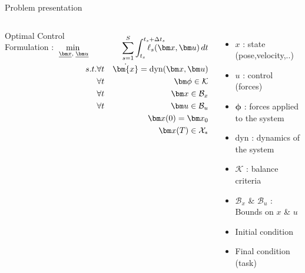 \begin{frame}{Problem presentation}

\begin{columns}


%



Optimal Control Formulation :

\begin{align*}
\hspace{-3em}	\underset{\substack{\hspace{0.2em} \underline{\bm x}, \; \underline{\bm u}} }{\min } \ \ \  
	& & \hspace{-3em} {\sum_{s=1}^S} \int_{t_{s}}^{t_{s}+\Delta t_s\hspace{-4em}} \ell_{s} (\bm x, \bm u) \, dt \\
	s.t. & \forall t & \dot{\bm{x}} = \text{dyn}(\bm x, \bm u) \\
	&  \forall t& \bm\phi \in \mathcal{K} \\
  &  \forall t& {\bm x} \in \mathcal{B}_x \\ 
  &  \forall t& {\bm u} \in \mathcal{B}_u \\ 
	& & \bm x(0) = \bm x_{0} \\
	& & \bm x(T) \in \mathcal{X}_*
\end{align*}


\vspace*{0.7cm}
\begin{itemize}
\item $x$ : state (pose,velocity,..)
\item $u$ : control (forces)
\item $\bm\phi$ : forces applied to the system
\item $\text{dyn}$ : dynamics of the system
\item $\mathcal{K}$ : balance criteria
\item $\mathcal{B}_x$ \& $\mathcal{B}_u$ : Bounds on $x$ \& $u$\\[0.5cm]
\item Initial condition
\item Final condition (task)
\end{itemize}

\end{columns}

\end{frame}


